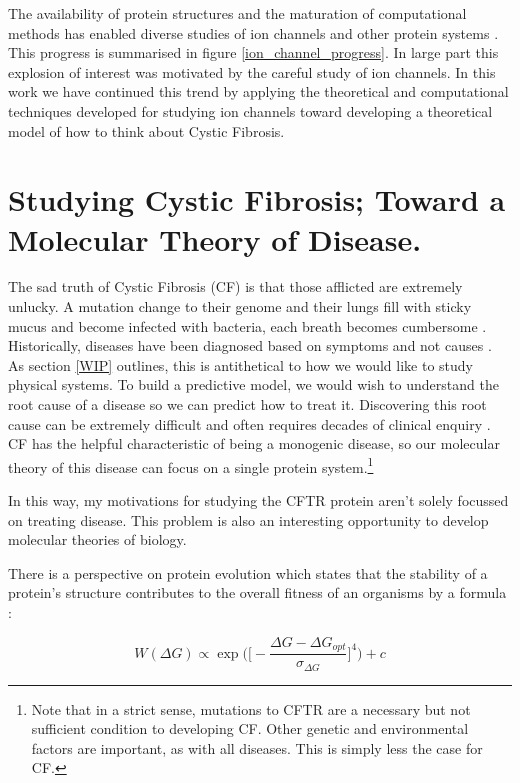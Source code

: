 The availability of protein structures and the maturation of computational methods has enabled diverse studies of ion channels and other protein systems \cite{lev2020, chen2021}. This progress is summarised in figure \ref{ion_channel_progress}. In large part this explosion of interest was motivated by the careful study of ion channels. In this work we have continued this trend by applying the theoretical and computational techniques developed for studying ion channels toward developing a theoretical model of how to think about Cystic Fibrosis. 





\section{Studying Cystic Fibrosis; Toward a Molecular Theory of Disease.} 

The sad truth of Cystic Fibrosis (CF) is that those afflicted are extremely unlucky. A mutation change to their genome and their lungs fill with sticky mucus and become infected with bacteria, each breath becomes cumbersome \cite{katkin2022}. Historically, diseases have been diagnosed based on symptoms and not causes \cite{foucault1994}. As section \ref{WIP} outlines, this is antithetical to how we would like to study physical systems. To build a predictive model, we would wish to understand the root cause of a disease so we can predict how to treat it. Discovering this root cause can be extremely difficult and often requires decades of clinical enquiry \cite{dubois2016, tsui2013}. CF has the helpful characteristic of being a monogenic disease, so our molecular theory of this disease can focus on a single protein system.\footnote{Note that in a strict sense, mutations to CFTR are a necessary but not sufficient condition to developing CF. Other genetic and environmental factors are important, as with all diseases. This is simply less the case for CF.}

In this way, my motivations for studying the CFTR protein aren't solely focussed on treating disease. This problem is also an interesting opportunity to develop molecular theories of biology. 

There is a perspective on protein evolution which states that the stability of a protein's structure contributes to the overall fitness of an organisms by a formula \cite{depristo2005}:

\begin{equation}
	\label{fitness_equation}
	W(\Delta G) \propto \exp\bigg(\bigg[-\frac{\Delta G - \Delta G_{opt}}{\sigma_{\Delta G}}\bigg]^4\bigg) + c
\end{equation}

